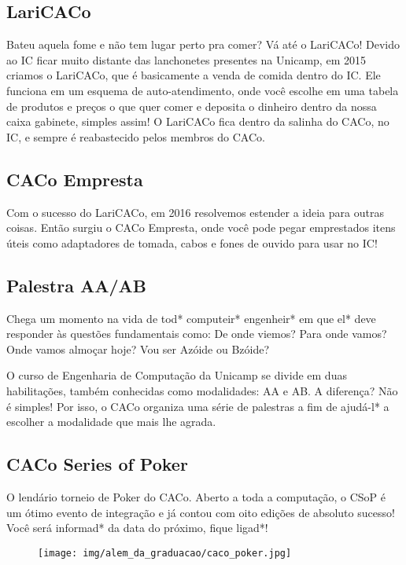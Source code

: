 \subsection{LariCACo}

Bateu aquela fome e não tem lugar perto pra comer? Vá até o LariCACo!  Devido ao
IC ficar muito distante das lanchonetes presentes na Unicamp, em 2015 criamos o
LariCACo, que é basicamente a venda de comida dentro do IC. Ele funciona em um
esquema de auto-atendimento, onde você escolhe em uma tabela de produtos e
preços o que quer comer e deposita o dinheiro dentro da nossa caixa gabinete,
simples assim! O LariCACo fica dentro da salinha do CACo, no IC, e sempre é
reabastecido pelos membros do CACo.

\subsection{CACo Empresta}

Com o sucesso do LariCACo, em 2016 resolvemos estender a ideia para outras
coisas. Então surgiu o CACo Empresta, onde você pode pegar emprestados itens
úteis como adaptadores de tomada, cabos e fones de ouvido para usar no IC!

\subsection{Palestra AA/AB}

Chega um momento na vida de tod* computeir* engenheir* em que el* deve responder
às questões fundamentais como: De onde viemos? Para onde vamos? Onde vamos
almoçar hoje? Vou ser Azóide ou Bzóide?

O curso de Engenharia de Computação da Unicamp se divide em duas habilitações,
também conhecidas como modalidades: AA e AB. A diferença? Não é simples! Por
isso, o CACo organiza uma série de palestras a fim de ajudá-l* a escolher a
modalidade que mais lhe agrada.

\subsection{CACo Series of Poker}

O lendário torneio de Poker do CACo. Aberto a toda a computação, o CSoP é um
ótimo evento de integração e já contou com oito edições de absoluto sucesso!
Você será informad* da data do próximo, fique ligad*!

\begin{figure}[H]
    \centering
    \texttt{[image: img/alem\_da\_graduacao/caco\_poker.jpg]}
\end{figure}

